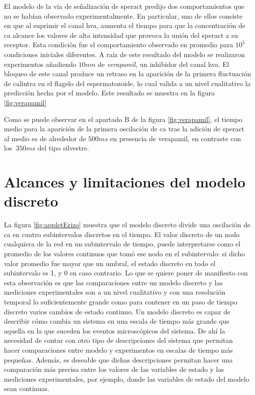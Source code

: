 El modelo de la vía de señalización de speract predijo dos comportamientos que no se habían observado experimentalmente. En particular, uno de ellos consiste en que al suprimir el canal \ac{hva}, aumenta el tiempo para que la concentración de \ac{ca} alcance los valores de alta intensidad que provoca la unión del speract a su receptor. Esta condición fue el comportamiento observado en promedio para $10^5$ condiciones iniciales diferentes. A raíz de este resultado del modelo se realizaron experimentos añadiendo $10  nm$ de \emph{verapamil}, un inhibidor del canal \ac{hva}. El bloqueo de este canal produce un retraso en la aparición de la primera fluctuación de \ac{calintra} en el flagelo del espermatozoide, lo cual valida a un nivel cualitativo la predicción hecha por el modelo. Este resultado se muestra en la figura \ref{fig:verapamil}

Como se puede observar en el apartado B de la figura \ref{fig:verapamil}, el tiempo medio para la aparición de la primera oscilación de \ac{ca} tras la adición de speract al medio es de alrededor de $500 ms$ en presencia de verapamil, en contraste con los $~350 ms$ del tipo silvestre. 

\section{Alcances y limitaciones del modelo discreto}

La figura \ref{fig:appletErizo} muestra que el modelo discreto divide una oscilación de \ac{ca} en cuatro subintervalos discretos en el tiempo. El valor discreto de un nodo cualquiera de la red en un subintervalo de tiempo, puede interpretarse como el promedio de los valores continuos que tomó ese nodo en el subintervalo: si dicho valor promedio fue mayor que un umbral, el estado discreto en todo el subintervalo es 1, y 0 en caso contrario. Lo que se quiere poner de manifiesto con esta observación es que las comparaciones entre un modelo discreto y las mediciones experimentales son a un nivel cualitativo y con una resolución temporal lo suficientemente grande como para contener en un paso de tiempo discreto varios cambios de estado continuo. Un modelo discreto es capaz de describir cómo cambia un sistema en una escala de tiempo más grande que aquella en la que suceden los eventos microscópicos del sistema. De ahí la necesidad de contar con otro tipo de descripciones del sistema que permitan hacer comparaciones entre modelo y experimentos en escalas de tiempo más pequeñas. Además, es deseable que dichas descripciones permitan hacer una comparación más precisa entre los valores de las variables de estado y las mediciones experimentales, por ejemplo, donde las variables de estado del modelo sean continuas.

